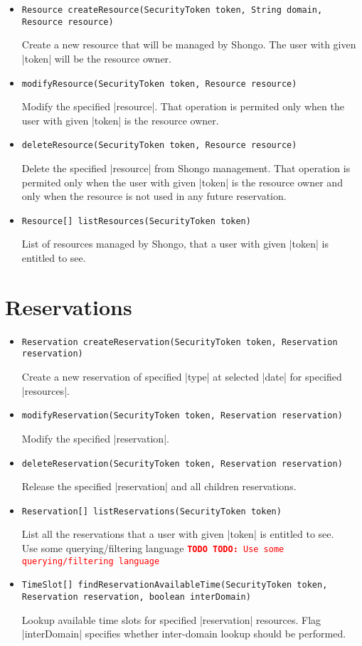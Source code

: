 \documentclass[a4paper]{report}
\newcommand{\APIcode}[1]{\lstinline[style=myinline]!#1!}
\newcommand{\APIcmd}[1]{%
\item \APIcode{#1}%

}
\newenvironment{APIdef}{\begin{itemize}}{\end{itemize}}
\newcommand{\TODO}[1]{%
\def\empty{}%
\def\prvniparametr{#1}%
\ifx\prvniparametr\empty%
\begingroup\tt\textcolor{red}{\noindent\textbf{TODO}}\endgroup
\else%
\begingroup\tt\textcolor{red}{\noindent\textbf{TODO:}\ #1}\endgroup
\fi%
}
\begin{document}
\begin{APIdef}

\APIcmd{Resource createResource(SecurityToken token, String domain, Resource resource)}
Create a new resource that will be managed by Shongo. The user with given |token| will be the resource owner.

\APIcmd{modifyResource(SecurityToken token, Resource resource)}
Modify the specified |resource|. That operation is permited only when the user with given |token| is the resource owner.

\APIcmd{deleteResource(SecurityToken token, Resource resource)}
Delete the specified |resource| from Shongo management. That operation is permited only when the user with given |token| is the resource owner and only when the resource is not used in any future reservation.

\APIcmd{Resource[] listResources(SecurityToken token)}
List of resources managed by Shongo, that a user with given |token| is entitled to see.

\end{APIdef}


\section{Reservations}

\begin{APIdef}

\APIcmd{Reservation createReservation(SecurityToken token, Reservation reservation)}
Create a new reservation of specified |type| at selected |date| for specified |resources|.

\APIcmd{modifyReservation(SecurityToken token, Reservation reservation)}
Modify the specified |reservation|.

\APIcmd{deleteReservation(SecurityToken token, Reservation reservation)}
Release the specified |reservation| and all children reservations.

\APIcmd{Reservation[] listReservations(SecurityToken token)}
List all the reservations that a user with given |token| is entitled to see.
\\ \TODO{Use some querying/filtering language}

\APIcmd{TimeSlot[] findReservationAvailableTime(SecurityToken token, Reservation reservation, boolean interDomain)}
Lookup available time slots for specified |reservation| resources. Flag |interDomain| specifies whether inter-domain lookup should be performed.


\end{APIdef}
\end{document}
